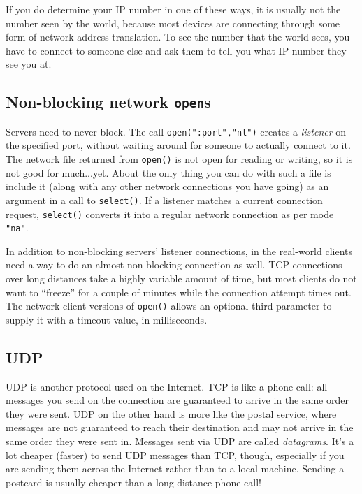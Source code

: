 If you do determine your IP number in one of these ways, it is usually not the
number seen by the world, because most devices are connecting through some form
of network address translation.  To see the number that the world sees, you have
to connect to someone else and ask them to tell you what IP number they see you
at.


\subsection*{Non-blocking network \texttt{open}s}

Servers need to never block. The call
\texttt{open(":port","nl")}
creates a \textit{listener} on the specified port, without waiting around for
someone to actually connect to it. The network file returned from
\texttt{open()} is not open for reading or writing, so it is not good for
much...yet. About the only thing you can do with such a file is include it
(along with any other network connections you have going) as an argument in a
call to \texttt{select()}. If a listener matches a current connection request,
\texttt{select()} converts it into a regular network connection as per mode
\texttt{"na"}.

In addition to non-blocking servers' listener connections, in the real-world
clients need a way to do an almost non-blocking connection as well.
TCP connections over long distances take a highly variable amount of time,
but most clients do not want to ``freeze'' for a couple of minutes while
the connection attempt times out. The network client versions of \texttt{open()}
allows an optional third parameter to supply it with a timeout value,
in milliseconds.

\subsection*{UDP}

UDP is another protocol used on the Internet. TCP is like a
phone call: all messages you send on the connection are guaranteed to
arrive in the same order they were sent. UDP on the other hand is more
like the postal service, where messages are not guaranteed to reach
their destination and may not arrive in the same order they were sent
in. Messages sent via UDP are called \textit{datagrams}.
It's a lot cheaper (faster) to send UDP messages than
TCP, though, especially if you are sending them across the Internet
rather than to a local machine. Sending a postcard is usually cheaper
than a long distance phone call!

